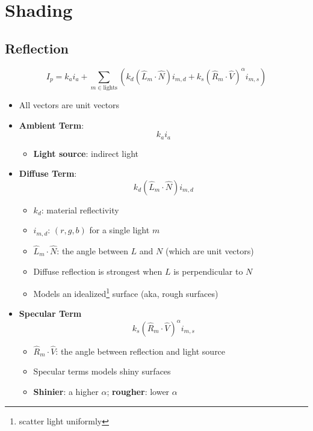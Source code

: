 \chapter{Shading}

\section{Reflection}

  \begin{equation}
    I_{p} = k_{a} i_{a} +
    \sum_{m \in \text{lights}}
    \left(
      k_{d} \left( \hat{L}_{m} \cdot \hat{N} \right) i_{m, d} +
      k_{s} \left( \hat{R}_{m} \cdot \hat{V} \right)^{\alpha} i_{m, s}
    \right)
  \end{equation}

  \begin{itemize}
    \item All vectors are unit vectors
    \item \textbf{Ambient Term}:
    \begin{equation}
      k_{a} i_{a}
    \end{equation}
    \begin{itemize}
      \item \textbf{Light source}: indirect light
    \end{itemize}

    \item \textbf{Diffuse Term}:
    \begin{equation}
      k_{d} \left( \hat{L}_{m} \cdot \hat{N} \right) i_{m, d}
    \end{equation}
    \begin{itemize}
      \item $ k_{d} $: material reflectivity
      \item $ i_{m, d} $: $ \left( r, g, b \right) $ for a single light $ m $
      \item $ \hat{L}_{m} \cdot \hat{N} $: the angle between $ L $ and $ N $
      (which are unit vectors)
      \item Diffuse reflection is strongest when $ L $ is
      perpendicular to $ N $
      \item Models an idealized\footnote{scatter light uniformly} surface
      (aka, rough surfaces)
    \end{itemize}

    \item \textbf{Specular Term}
    \begin{equation}
      k_{s} \left( \hat{R}_{m} \cdot \hat{V} \right)^{\alpha} i_{m, s}
    \end{equation}
    \begin{itemize}
      \item $ \hat{R}_{m} \cdot \hat{V} $: the angle between reflection and
      light source
      \item Specular terms models shiny surfaces
      \item \textbf{Shinier}: a higher $ \alpha $; \textbf{rougher}:
      lower $ \alpha $
    \end{itemize}
  \end{itemize}

